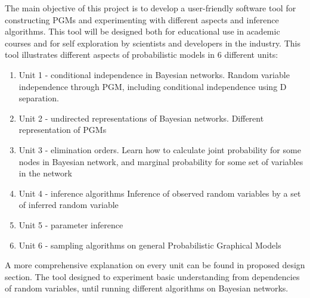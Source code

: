 \documentclass{article}
\begin{document}
    The main objective of this project is to develop a user-friendly software tool for constructing PGMs and experimenting with different aspects and inference algorithms. This tool will be designed both for educational use in academic courses and for self exploration by scientists and developers in the industry. This tool illustrates different aspects of probabilistic models in 6 different units:
    \begin{enumerate}
        \item Unit 1 - conditional independence in Bayesian networks. Random variable independence through PGM, including conditional independence using D separation.
        \item Unit 2 - undirected representations of Bayesian networks. Different representation of PGMs
        \item Unit 3 - elimination orders. Learn how to calculate joint probability for some nodes in Bayesian network, and marginal probability for some set of variables in the network
        \item Unit 4 - inference algorithms
                Inference of observed random variables by a set of inferred random variable
        \item Unit 5 - parameter inference
        \item Unit 6 - sampling algorithms on general Probabilistic Graphical Models
    \end{enumerate}
    A more comprehensive explanation on every unit can be found in proposed design section. The tool designed to experiment basic understanding from dependencies of random variables, until running different algorithms on Bayesian networks.\\~\\
\end{document}
